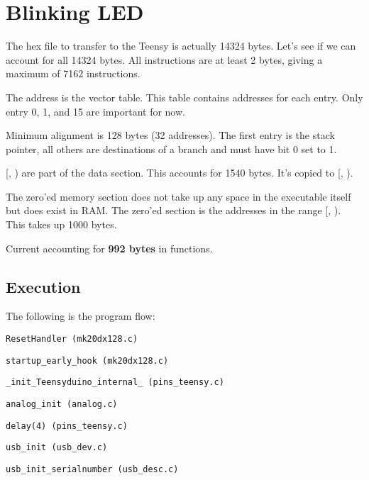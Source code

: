 \newpage
\section{Blinking LED}

The hex file to transfer to the Teensy is actually 14324 bytes.
Let's see if we can account for all 14324 bytes.
All instructions are at least 2 bytes, giving a maximum of 7162 instructions.

The address  is the vector table. This table contains
addresses for each entry. Only entry 0, 1, and 15 are important for now.

Minimum alignment is 128 bytes (32 addresses). The first entry is the stack
pointer, all others are destinations of a branch and must have bit 0 set to 1.

[, ) are part of the data
section. This accounts for 1540 bytes. It's copied to
[, ).

The zero'ed memory section does not take up any space in the executable itself
but does exist in RAM. The zero'ed section is the addresses in the range
[, ).
This takes up 1000 bytes.

Current accounting for \textbf{992 bytes} in functions.

\subsection{Execution}

The following is the program flow:

\indent \texttt{ResetHandler (mk20dx128.c)}

\hspace{2mm} \texttt{startup\_early\_hook (mk20dx128.c)}

\hspace{2mm} \texttt{\_init\_Teensyduino\_internal\_ (pins\_teensy.c)}

\hspace{4mm} \texttt{analog\_init (analog.c)}

\hspace{4mm} \texttt{delay(4) (pins\_teensy.c)}

\hspace{4mm} \texttt{usb\_init (usb\_dev.c)}

\hspace{6mm} \texttt{usb\_init\_serialnumber (usb\_desc.c)}

